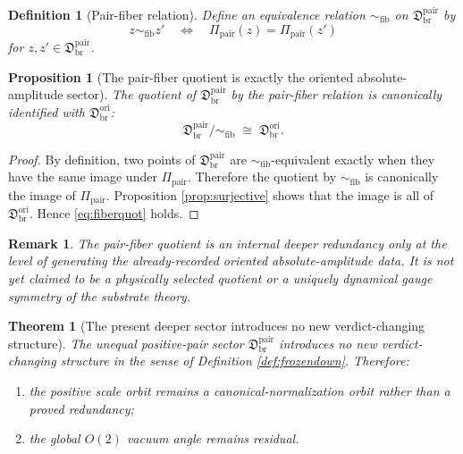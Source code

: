 \documentclass[11pt]{article}
\newcommand{\OriginSector}{\mathfrak D_{\mathrm{br}}^{\mathrm{ori}}}
\newcommand{\PairSector}{\mathfrak D_{\mathrm{br}}^{\mathrm{pair}}}
\newcommand{\PairMap}{\Pi_{\mathrm{pair}}}
\newcommand{\PairFiber}{\sim_{\mathrm{fib}}}
\newtheorem{definition}{Definition}
\newtheorem{proposition}{Proposition}
\newtheorem{remark}{Remark}
\newtheorem{theorem}{Theorem}
\begin{document}
\begin{definition}[Pair-fiber relation]
\label{def:fiber}
Define an equivalence relation \(\PairFiber\) on \(\PairSector\) by
\begin{equation}
z\PairFiber z'
\quad\Longleftrightarrow\quad
\PairMap(z)=\PairMap(z')
\label{eq:fiber}
\end{equation}
for \(z,z'\in\PairSector\).
\end{definition}

\begin{proposition}[The pair-fiber quotient is exactly the oriented absolute-amplitude sector]
\label{prop:fiberquot}
The quotient of \(\PairSector\) by the pair-fiber relation is canonically identified with \(\OriginSector\):
\begin{equation}
\PairSector/\PairFiber
\;\cong\;
\OriginSector.
\label{eq:fiberquot}
\end{equation}
\end{proposition}

\begin{proof}
By definition, two points of \(\PairSector\) are \(\PairFiber\)-equivalent exactly when they have the same image under \(\PairMap\). Therefore the quotient by \(\PairFiber\) is canonically the image of \(\PairMap\). Proposition \ref{prop:surjective} shows that the image is all of \(\OriginSector\). Hence \eqref{eq:fiberquot} holds.
\end{proof}

\begin{remark}
The pair-fiber quotient is an internal deeper redundancy only at the level of generating the already-recorded oriented absolute-amplitude data. It is not yet claimed to be a physically selected quotient or a uniquely dynamical gauge symmetry of the substrate theory.
\end{remark}

\begin{theorem}[The present deeper sector introduces no new verdict-changing structure]
\label{thm:verdict}
The unequal positive-pair sector \(\PairSector\) introduces no new verdict-changing structure in the sense of Definition \ref{def:frozendown}. Therefore:
\begin{enumerate}
    \item the positive scale orbit remains a canonical-normalization orbit rather than a proved redundancy;
    \item the global \(O(2)\) vacuum angle remains residual.
\end{enumerate}
\end{theorem}
\end{document}
